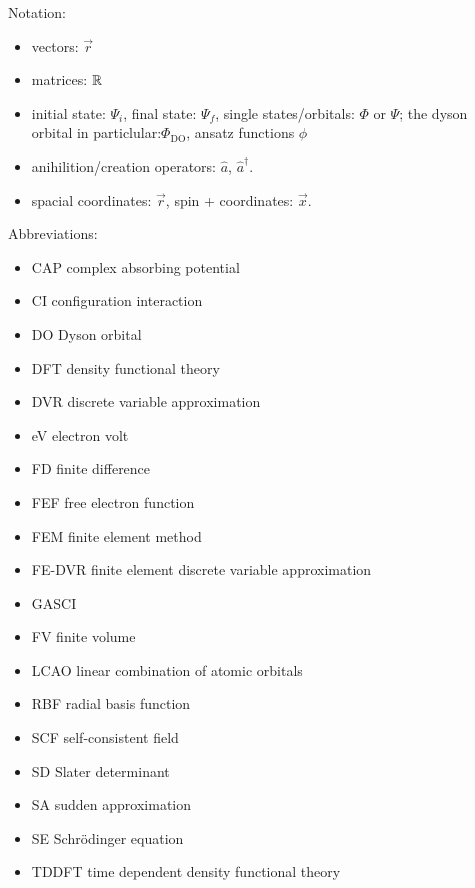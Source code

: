 Notation:\\
\begin{itemize}
   \item vectors: $\vec{r}$
   \item matrices: $\mathbb{R}$
   \item initial state:  $\Psi_i$, final state: $\Psi_f$, single states/orbitals: $\Phi$ or $\Psi$; the dyson orbital in particlular:$\Phi_\text{DO}$, ansatz functions $\phi$
   \item anihilition/creation operators: $\hat{a}$, $\hat{a}^\dagger$.
   \item spacial coordinates: $\vec{r}$, spin + coordinates: $\vec{x}$.
\end{itemize}

Abbreviations:
\begin{itemize}
   \item CAP complex absorbing potential
   \item CI configuration interaction
   \item DO Dyson orbital
   \item DFT density functional theory
   \item DVR discrete variable approximation
   \item eV electron volt
   \item FD finite difference
   \item FEF free electron function
   \item FEM finite element method
   \item FE-DVR finite element discrete variable approximation
   \item GASCI 
   \item FV finite volume
   \item LCAO linear combination of atomic orbitals
   \item RBF radial basis function
   \item SCF self-consistent field
   \item SD Slater determinant
   \item SA sudden approximation
   \item SE Schr\"odinger equation
   \item TDDFT time dependent density functional theory
\end{itemize}

